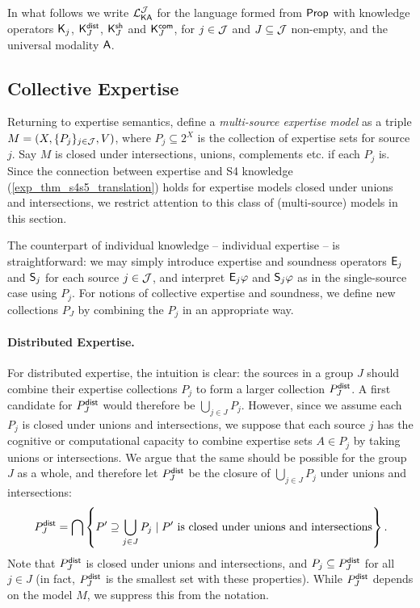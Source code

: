 In what follows we write $\cLKAJ$ for the language formed from $\Prop$ with
knowledge operators $\K_j$, $\Kdist_J$, $\Kshared_J$ and $\Kcommon_J$, for $j
\in \J$ and $J \subseteq \J$ non-empty, and the universal modality $\A$.

\subsection{Collective Expertise}

Returning to expertise semantics, define a \emph{multi-source expertise model}
as a triple $M = (X, \{P_j\}_{j \in \J}, V)$, where $P_j \subseteq 2^X$ is the
collection of expertise sets for source $j$. Say $M$ is closed under
intersections, unions, complements etc. if each $P_j$ is. Since the connection
between expertise and S4 knowledge (\cref{exp_thm_s4s5_translation}) holds for
expertise models closed under unions and intersections, we restrict
attention to this class of (multi-source) models in this section.

The counterpart of individual knowledge -- individual expertise -- is
straightforward: we may simply introduce expertise and soundness operators
$\E_j$ and $\S_j$ for each source $j \in \J$, and interpret
$\E_j\phi$ and $\S_j\phi$ as in the single-source case using
$P_j$. For notions of collective expertise and soundness, we define new
collections $P_J$ by combining the $P_j$ in an appropriate way.

\paragraph{Distributed Expertise.}

For distributed expertise, the intuition is clear: the sources in a group
$J$ should combine their expertise collections $P_j$ to form a
larger collection $\Pdist_J$. A first candidate for $\Pdist_J$
would therefore be $\bigcup_{j \in J}{P_j}$. However, since we assume
each $P_j$ is closed under unions and intersections, we suppose that each
source $j$ has the cognitive or computational capacity to combine expertise
sets $A \in P_j$ by taking unions or intersections. We argue that the
same should be possible for the group $J$ as a whole, and therefore let
$\Pdist_J$ be the closure of $\bigcup_{j \in J}{P_j}$ under unions
and intersections:
\[
\Pdist_J
= \bigcap\left\{
 P' \supseteq \bigcup_{j \in J}{P_j}
 \mid
 P' \text{ is closed under unions and intersections}
\right\}.\]
Note that $\Pdist_J$ is closed under unions and intersections, and
$P_j \subseteq \Pdist_J$ for all $j \in J$ (in fact,
$\Pdist_J$ is the smallest set with these properties). While
$\Pdist_J$ depends on the model $M$, we suppress this from the
notation.

